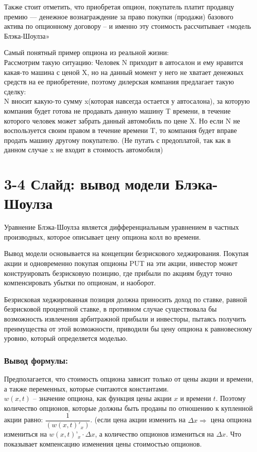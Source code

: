 \documentclass[a4paper]{article}
\begin{document}
Также стоит отметить, что приобретая опцион, покупатель платит продавцу премию — денежное вознаграждение за право покупки (продажи) базового актива по опционному договору -- и именно эту стоимость рассчитывает «модель Блэка-Шоулза»

Самый понятный пример опциона из реальной жизни:\\
Рассмотрим такую ситуацию:
Человек N приходит в автосалон и ему нравится какая-то машина с ценой X, но на данный момент у него не хватает денежных средств на ее приобретение, поэтому дилерская компания предлагает такую сделку:\\
N вносит какую-то сумму x(которая навсегда остается у автосалона), за которую компания будет готова не продавать данную машину T времени, в течение которого человек может забрать данный автомобиль по цене X.
Но если N не воспользуется своим правом в течение времени T, то компания будет вправе продать машину другому покупателю.
(Не путать с предоплатой, так как в данном случае x не входит в стоимость автомобиля)

\section*{3-4 Слайд: вывод модели Блэка-Шоулза}
Уравнение Блэка-Шоулза является дифференциальным уравнением в частных производных, которое описывает цену опциона колл во времени.

Вывод модели основывается на концепции безрискового хеджирования. Покупая акции и одновременно покупая опционы PUT на эти акции, инвестор может конструировать безрисковую позицию, где прибыли по акциям будут точно компенсировать убытки по опционам, и наоборот.

Безрисковая хеджированная позиция должна приносить доход по ставке, равной безрисковой процентной ставке, в противном случае существовала бы возможность извлечения арбитражной прибыли и инвесторы, пытаясь получить преимущества от этой возможности, приводили бы цену опциона к равновесному уровню, который определяется моделью.

\subsubsection*{Вывод формулы:}
Предполагается, что стоимость опциона зависит только от цены акции и времени, а также переменных, которые считаются константами. \\
$w(x, t)$ -- значение опциона, как функция цены акции $x$ и времени $t$. Поэтому количество опционов, которые должны быть проданы по отношению к купленной акции равно: $\dfrac{1}{(w(x,t)'_x)}$. (если цена акции изменить на $\Delta x \Rightarrow$  цена опциона измениться на $w(x,t)’_x \cdot \Delta x$, а количество опционов измениться на $\Delta x$. Что показывает компенсацию изменения цены стоимостью опционов.
\end{document}
